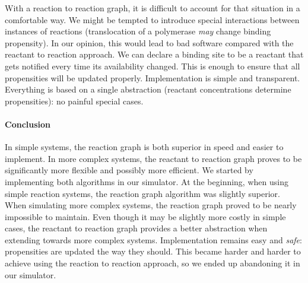 With a reaction to reaction graph, it is difficult to account for that situation in a comfortable way.
We might be tempted to introduce special interactions between instances of reactions
(translocation of a polymerase \emph{may} change binding propensity).
In our opinion, this would lead to bad software compared with the reactant to reaction approach.
We can declare a binding site to be a reactant that gets notified every time its availability changed.
This is enough to ensure that all propensities will be updated properly.
Implementation is simple and transparent.
Everything is based on a single abstraction (reactant concentrations determine propensities): no painful special cases.

\paragraph{Conclusion}
In simple systems, the reaction graph is both superior in speed and easier to implement.
In more complex systems, the reactant to reaction graph proves to be significantly more flexible and possibly more efficient.
We started by implementing both algorithms in our simulator.
At the beginning, when using simple reaction systems, the reaction graph algorithm was slightly superior.
When simulating more complex systems, the reaction graph proved to be nearly impossible to maintain.
Even though it may be slightly more costly in simple cases,
the reactant to reaction graph provides a better abstraction when extending towards more complex systems.
Implementation remains easy and \emph{safe}: propensities are updated the way they should.
This became harder and harder to achieve using the reaction to reaction approach,
so we ended up abandoning it in our simulator.
